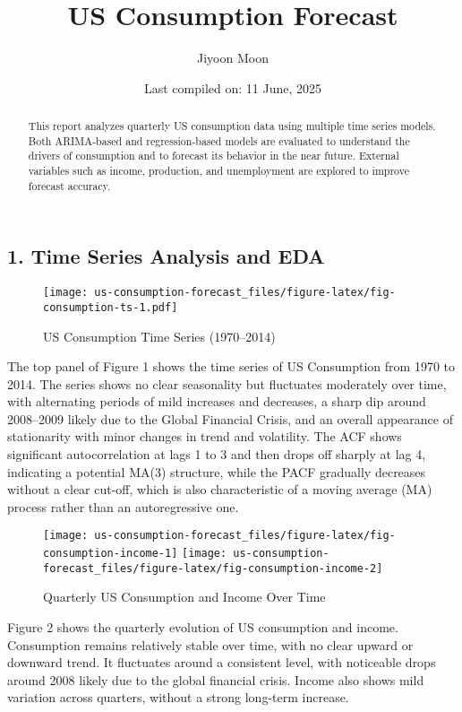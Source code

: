 \documentclass[
  12pt,
]{article}
\title{US Consumption Forecast}
\author{Jiyoon Moon}
\date{Last compiled on: 11 June, 2025}
\begin{document}
\maketitle
\begin{abstract}
This report analyzes quarterly US consumption data using multiple time
series models. Both ARIMA-based and regression-based models are
evaluated to understand the drivers of consumption and to forecast its
behavior in the near future. External variables such as income,
production, and unemployment are explored to improve forecast accuracy.
\end{abstract}

\thispagestyle{empty}
\newpage
\setcounter{page}{1}

\hypertarget{time-series-analysis-and-eda}{%
\subsection{1. Time Series Analysis and
EDA}\label{time-series-analysis-and-eda}}

\begin{figure}
\centering
\texttt{[image: us-consumption-forecast\_files/figure-latex/fig-consumption-ts-1.pdf]}
\caption{US Consumption Time Series (1970--2014)}
\end{figure}

The top panel of Figure 1 shows the time series of US Consumption from
1970 to 2014. The series shows no clear seasonality but fluctuates
moderately over time, with alternating periods of mild increases and
decreases, a sharp dip around 2008--2009 likely due to the Global
Financial Crisis, and an overall appearance of stationarity with minor
changes in trend and volatility. The ACF shows significant
autocorrelation at lags 1 to 3 and then drops off sharply at lag 4,
indicating a potential MA(3) structure, while the PACF gradually
decreases without a clear cut-off, which is also characteristic of a
moving average (MA) process rather than an autoregressive one.

\begin{figure}
\texttt{[image: us-consumption-forecast\_files/figure-latex/fig-consumption-income-1]} \texttt{[image: us-consumption-forecast\_files/figure-latex/fig-consumption-income-2]} \caption{Quarterly US Consumption and Income Over Time}\label{fig:fig-consumption-income}
\end{figure}

Figure 2 shows the quarterly evolution of US consumption and income.
Consumption remains relatively stable over time, with no clear upward or
downward trend. It fluctuates around a consistent level, with noticeable
drops around 2008 likely due to the global financial crisis. Income also
shows mild variation across quarters, without a strong long-term
increase.
\end{document}
